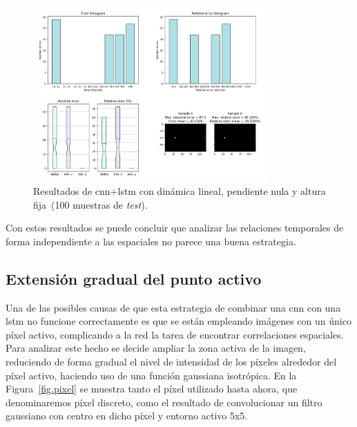 \begin{figure}[H]
		\begin{center}
			\includegraphics[width=0.8\textwidth]{ figures/test_raw/REC/CONV+LSTM/URM_fix_1000.png}
			\caption{Resultados de \acrshort{cnn}+\acrshort{lstm} con dinámica lineal, pendiente nula y altura fija~(100 muestras de \textit{test}).} 
			\label{fig.raw_rec_urm_fix_1000}
		\end{center}
\end{figure}
\vspace{-10pt}

Con estos resultados se puede concluir que analizar las relaciones temporales de forma independiente a las espaciales no parece una buena estrategia.

\subsection{Extensión gradual del punto activo}
Una de las posibles causas de que esta estrategia de combinar una \acrshort{cnn} con una \acrshort{lstm} no funcione correctamente es que se están empleando  imágenes con un único píxel activo, complicando a la red la tarea de encontrar correlaciones espaciales. Para analizar este hecho se decide ampliar la zona activa de la imagen, reduciendo de forma gradual el nivel de intensidad de los píxeles alrededor del píxel activo, haciendo uso de una función gaussiana isotrópica. En la Figura~\ref{fig.pixel} se muestra tanto el píxel utilizado hasta ahora, que denominaremos píxel discreto, como el resultado de convolucionar un filtro gaussiano con centro en dicho píxel y entorno activo 5x5.

